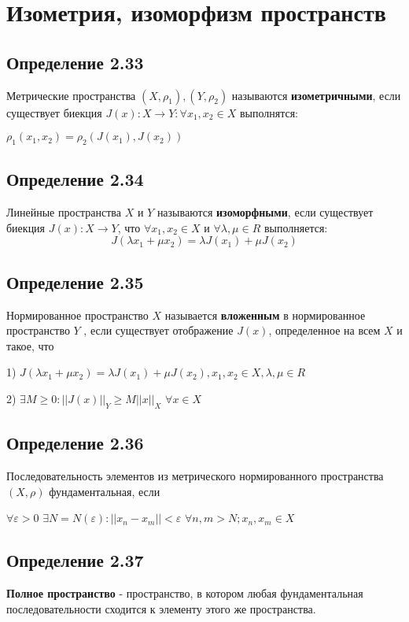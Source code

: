 \documentclass[12pt, english]{article}
\begin{document}
	
	
	
\section{Изометрия, изоморфизм пространств}

\subsection*{Определение 2.33}
	Метрические пространства $(X , \rho_1) , (Y , \rho_2)$ называются \textbf{изометричными}, если существует биекция  	
	$J(x) : X \to Y : \forall x_1,x_2 \in X$ выполнятся:
		
	$\rho_1(x_1,x_2) = \rho_2(J(x_1) , J(x_2))	$	



\subsection*{Определение 2.34}
Линейные пространства $X$ и $Y$ называются \textbf{изоморфными}, если
существует биекция $J(x) : X \to Y$, что $ \forall x_1, x_2 \in  X$ и $\forall \lambda , \mu \in R$ выполняется:
	$$J(\lambda x_1 + \mu x_2) = \lambda J(x_1) + \mu J(x_2)$$
	
	
\subsection{Определение 2.35}	
	Нормированное пространство $X$ называется \textbf{вложенным} в нормированное пространство $Y$ , если 			   	существует отображение $J(x)$,	
	определенное на всем $X$ и такое, что

	1) $J(\lambda x_1 + \mu x_2) = \lambda J(x_1) + \mu J(x_2), x_1, x_2 \in X, \lambda, \mu \in R$

	2) $\exists M \ge 0 : ||J(x)||_Y \ge M||x||_X$ $\forall x \in X$
	
\subsection{Определение 2.36}
	Последовательность элементов из метрического нормированного пространства $(X,\rho)$ фундаментальная, если
	
	$\forall \varepsilon > 0$ $\exists N = N(\varepsilon) : ||x_n - x_m|| < \varepsilon$ $\forall n, m > N; x_n, x_m \in X$  
	
\subsection{Определение 2.37}
	\textbf{Полное пространство} - пространство, в котором любая фундаментальная последовательности сходится
	к элементу этого же пространства.
\end{document}
